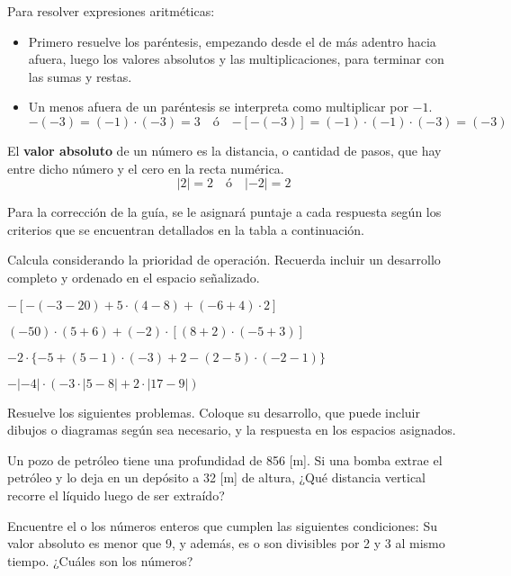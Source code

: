 \documentclass{prueba}
\begin{document}
Para resolver expresiones aritméticas:
\begin{itemize}
    \item Primero resuelve los paréntesis, empezando desde el de más adentro hacia afuera, 
    luego los valores absolutos y las multiplicaciones, para terminar con las sumas 
    y restas.
    \item Un menos afuera de un paréntesis se interpreta como multiplicar por $-1$.  
    \begin{equation*}
        \boxed{-(-3) = (-1)\cdot(-3) = 3} \quad \text{ó} \quad
        \boxed{-[-(-3)] = (-1)\cdot(-1)\cdot(-3) = (-3)}
    \end{equation*}
\end{itemize}

El {\bfseries valor absoluto} de un número es la distancia, o cantidad de pasos, que
hay entre dicho número y el cero en la recta numérica.
\begin{equation*}
    \boxed{\left|2\right|=2} \quad \text{ó} \quad \boxed{\left|-2\right|=2}
\end{equation*}


Para la corrección de la guía, se le asignará puntaje a cada respuesta según los criterios
que se encuentran detallados en la tabla a continuación.

\pauta

\parte{} Calcula considerando la prioridad de operación. Recuerda incluir un desarrollo 
completo y ordenado en el espacio señalizado.

\pregunta{} $-[-(-3-20)+5\cdot(4-8)+(-6+4)\cdot 2]$
\desarrollo[3cm]

\pregunta{} $(-50)\cdot(5+6)+(-2)\cdot[(8+2)\cdot(-5+3)]$
\desarrollo[3cm]

\pregunta{} $-2\cdot\{-5+(5-1)\cdot(-3)+2-(2-5)\cdot(-2-1)\}$
\desarrollo[3cm]

\pregunta{} $-\left|-4\right|\cdot\left(-3\cdot\left|5-8\right|+2\cdot\left|17-9\right|\right)$
\desarrollo[3cm]

\parte{} Resuelve los siguientes problemas. Coloque su desarrollo, que puede incluir dibujos o
diagramas según sea necesario, y la respuesta en los espacios asignados.

\pregunta{} Un pozo de petróleo tiene una profundidad de 856 [m]. Si una bomba extrae el 
petróleo y lo deja en un depósito a 32 [m] de altura, ¿Qué distancia vertical recorre el 
líquido luego de ser extraído?
\desarrollo[3cm]
\respuesta

\pregunta{} Encuentre el o los números enteros que cumplen las siguientes condiciones: Su valor 
absoluto es menor que 9, y además, es o son divisibles por 2 y 3 al mismo tiempo. 
¿Cuáles son los números?
\desarrollo[3cm]
\respuesta
\end{document}
